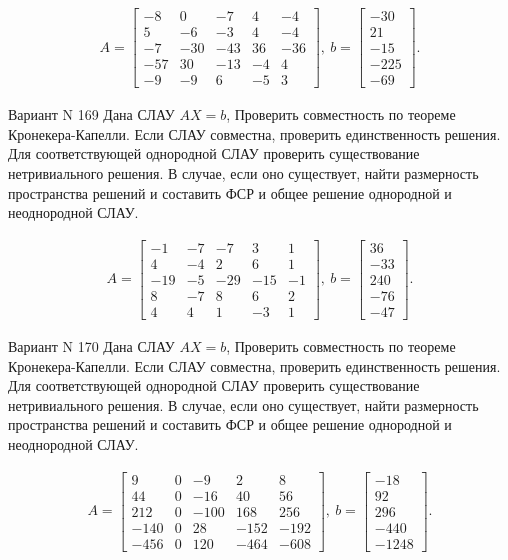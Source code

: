 \documentclass[11pt]{report}
\begin{document}
\begin{align*}
 A = \left[\begin{matrix}-8 & 0 & -7 & 4 & -4\\5 & -6 & -3 & 4 & -4\\-7 & -30 & -43 & 36 & -36\\-57 & 30 & -13 & -4 & 4\\-9 & -9 & 6 & -5 & 3\end{matrix}\right],
\ b = \left[\begin{matrix}-30\\21\\-15\\-225\\-69\end{matrix}\right]. 
 \end{align*}

Вариант N 169
Дана СЛАУ $AX = b$,
Проверить совместность по теореме Кронекера-Капелли. Если СЛАУ совместна, проверить единственность решения.
Для соответствующей однородной СЛАУ проверить существование нетривиального решения. В случае, если оно существует,
найти размерность пространства решений и составить ФСР и общее решение однородной  и неоднородной СЛАУ.


\begin{align*}
 A = \left[\begin{matrix}-1 & -7 & -7 & 3 & 1\\4 & -4 & 2 & 6 & 1\\-19 & -5 & -29 & -15 & -1\\8 & -7 & 8 & 6 & 2\\4 & 4 & 1 & -3 & 1\end{matrix}\right],
\ b = \left[\begin{matrix}36\\-33\\240\\-76\\-47\end{matrix}\right]. 
 \end{align*}

Вариант N 170
Дана СЛАУ $AX = b$,
Проверить совместность по теореме Кронекера-Капелли. Если СЛАУ совместна, проверить единственность решения.
Для соответствующей однородной СЛАУ проверить существование нетривиального решения. В случае, если оно существует,
найти размерность пространства решений и составить ФСР и общее решение однородной  и неоднородной СЛАУ.


\begin{align*}
 A = \left[\begin{matrix}9 & 0 & -9 & 2 & 8\\44 & 0 & -16 & 40 & 56\\212 & 0 & -100 & 168 & 256\\-140 & 0 & 28 & -152 & -192\\-456 & 0 & 120 & -464 & -608\end{matrix}\right],
\ b = \left[\begin{matrix}-18\\92\\296\\-440\\-1248\end{matrix}\right]. 
 \end{align*}
\end{document}
